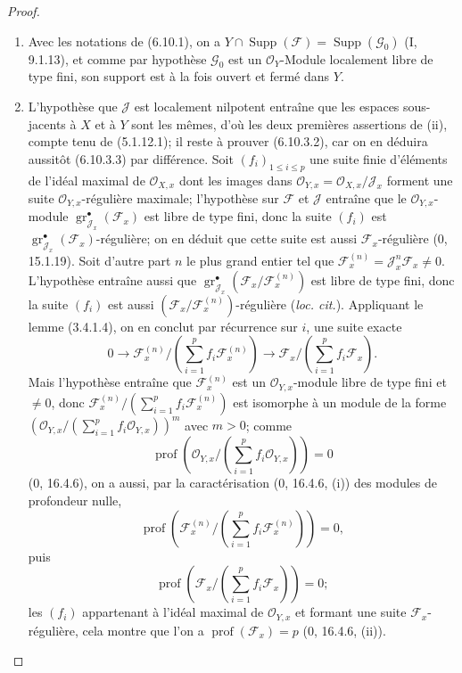 \begin{proof}
\begin{enumerate}
\item[(i)] Avec les notations de (6.10.1), on a
$Y\cap\operatorname{Supp}(\mathcal F)=\operatorname{Supp}(\mathcal G_0)$
(I, 9.1.13), et comme par hypothèse $\mathcal G_0$ est un
$\mathcal O_Y$-Module localement libre de type fini, son support est à la fois
ouvert et fermé dans $Y$.


\item[(ii)] L'hypothèse que $\mathcal J$ est localement nilpotent entraîne que
les espaces sous-jacents à $X$ et à $Y$ sont les mêmes, d'où les deux premières
assertions de (ii), compte tenu de (5.1.12.1); il reste à prouver (6.10.3.2),
car on en déduira aussitôt (6.10.3.3) par différence. Soit
$(f_i)_{1\leq i\leq p}$ une suite finie d'éléments de l'idéal maximal de
$\mathcal O_{X,x}$ dont les images dans
$\mathcal O_{Y,x}=\mathcal O_{X,x}/\mathcal J_x$ forment une suite
$\mathcal O_{Y,x}$-régulière maximale; l'hypothèse sur $\mathcal F$ et
$\mathcal J$ entraîne que le $\mathcal O_{Y,x}$-module
$\operatorname{gr}_{\mathcal J_x}^{\bullet}(\mathcal F_x)$ est libre de type
fini, donc la suite $(f_i)$ est
$\operatorname{gr}_{\mathcal J_x}^{\bullet}(\mathcal F_x)$-régulière; on en
déduit que cette suite est aussi $\mathcal F_x$-régulière (0, 15.1.19). Soit
d'autre part $n$ le plus grand entier tel que
$\mathcal F_x^{(n)}=\mathcal J_x^n\mathcal F_x\ne0$. L'hypothèse entraîne
aussi que
$\operatorname{gr}_{\mathcal J_x}^{\bullet}
(\mathcal F_x/\mathcal F_x^{(n)})$ est libre de type fini, donc la suite
$(f_i)$ est aussi $(\mathcal F_x/\mathcal F_x^{(n)})$-régulière
(\emph{loc. cit.}). Appliquant le lemme (3.4.1.4), on en conclut par récurrence
sur $i$, une suite exacte
\[
0\longrightarrow
\mathcal F_x^{(n)}/\left(\sum_{i=1}^{p}f_i\mathcal F_x^{(n)}\right)
\longrightarrow
\mathcal F_x/\left(\sum_{i=1}^{p}f_i\mathcal F_x\right).
\]
Mais l'hypothèse entraîne que $\mathcal F_x^{(n)}$ est un
$\mathcal O_{Y,x}$-module libre de type fini et $\ne0$, donc
$\mathcal F_x^{(n)}/(\sum_{i=1}^{p}f_i\mathcal F_x^{(n)})$ est isomorphe à
un module de la forme
$(\mathcal O_{Y,x}/(\sum_{i=1}^{p}f_i\mathcal O_{Y,x}))^m$ avec $m>0$; comme
\[
\operatorname{prof}\left(\mathcal O_{Y,x}/
\left(\sum_{i=1}^{p}f_i\mathcal O_{Y,x}\right)\right)=0
\]
(0, 16.4.6), on a aussi, par la caractérisation (0, 16.4.6, (i)) des modules
de profondeur nulle,
\[
\operatorname{prof}\left(\mathcal F_x^{(n)}/
\left(\sum_{i=1}^{p}f_i\mathcal F_x^{(n)}\right)\right)=0,
\]
puis
\[
\operatorname{prof}\left(\mathcal F_x/
\left(\sum_{i=1}^{p}f_i\mathcal F_x\right)\right)=0;
\]
les $(f_i)$ appartenant à l'idéal maximal de $\mathcal O_{Y,x}$ et formant
une suite $\mathcal F_x$-régulière, cela montre que l'on a
$\operatorname{prof}(\mathcal F_x)=p$ (0, 16.4.6, (ii)).
\end{enumerate}
\end{proof}

